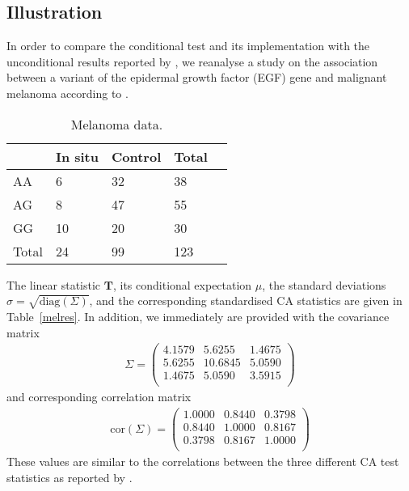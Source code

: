 \documentclass[bimj,fleqn]{w-art}
\newcommand{\T}{\mathbf{T}}
\begin{document}
\subsection{Illustration}

In order to compare the conditional test and its implementation with the
unconditional results reported by \citet{Freidlin:2002}, we reanalyse a study on the association
between a variant of the epidermal growth factor 
(EGF) gene and malignant melanoma according to
\citet[Table~\ref{mel},][]{Shahbazi:2002}.


\begin{table}
\begin{center}
\caption{Melanoma data. \label{mel}}
\vspace*{0.5cm}
\begin{tabular}{l l l l l}
 &  In situ & Control & Total \\ \hline 
AA  &  6 & 32 & 38  \\ 
AG  &  8 & 47 & 55  \\ 
GG  &  10 & 20 & 30  \\ 
Total  &  24 & 99 & 123  \\ \hline
\end{tabular}
\end{center}
\end{table}



The linear statistic $\T$, its conditional expectation $\mu$,
the standard deviations $\sigma = \sqrt{\text{diag}(\Sigma)}$, and 
the corresponding standardised CA statistics are given in
Table~\ref{melres}. 
In addition, we immediately are provided with the covariance matrix
\begin{eqnarray*}
\Sigma = \left( \begin{array}{rrr} 
4.1579 & 5.6255 & 1.4675 \\ 
5.6255 & 10.6845 & 5.0590 \\ 
1.4675 & 5.0590 & 3.5915 \\ \end{array} \right)
\end{eqnarray*}
and corresponding correlation matrix
\begin{eqnarray*}
\text{cor}(\Sigma) = \left( \begin{array}{rrr} 
1.0000 & 0.8440 & 0.3798 \\ 
0.8440 & 1.0000 & 0.8167 \\ 
0.3798 & 0.8167 & 1.0000 \\ \end{array} \right)
\end{eqnarray*}
These values are similar to the correlations between the 
three different CA test statistics as reported by
\citet{Freidlin:2002}.
\end{document}
